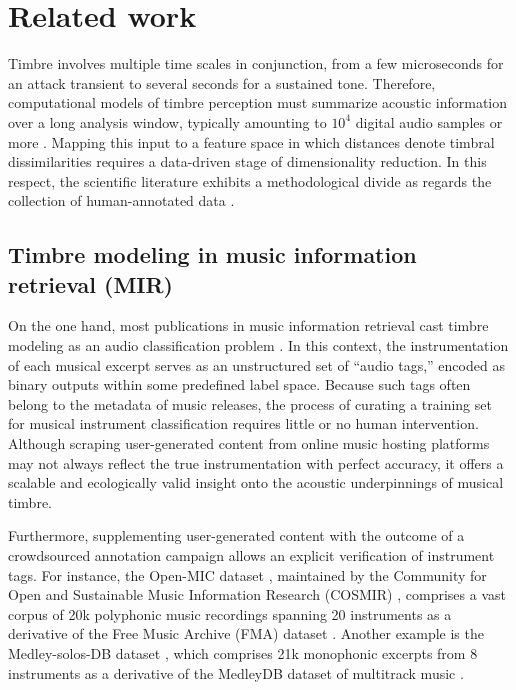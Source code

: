 \documentclass{bmcart}
\newcommand{\nmu}{}
\begin{document}
\section*{\nmu Related work}
\label{sec:soa}

Timbre involves multiple time scales in conjunction, from a few microseconds for an attack transient to several seconds for a sustained tone.
Therefore, computational models of timbre perception must summarize acoustic information over a long analysis window, typically amounting to $10^{4}$ digital audio samples or more \cite{joder2009taslp}.
Mapping this input to a feature space in which distances denote timbral dissimilarities requires a data-driven stage of dimensionality reduction.
In this respect, the scientific literature exhibits a methodological divide as regards the collection of human-annotated data \cite{siedenburg2016jnmr}.


\subsection*{Timbre modeling in music information retrieval (MIR)}
On the one hand, most publications in music information retrieval cast timbre modeling as an audio classification problem  \cite{martin1998asa,brown1999jasa,eronen2000icassp,herrera2003jnmr,wieczorkowska2003jiis,livshin2004dafx,krishna2004icassp,kaminskyj2005jiis,benetos2006icassp,bhalke2016jiis}.
In this context, the instrumentation of each musical excerpt serves as an unstructured set of ``audio tags,'' encoded as binary outputs within some predefined label space.
Because such tags often belong to the metadata of music releases, the process of curating a training set for musical instrument classification requires little or no human intervention.
Although scraping user-generated content from online music hosting platforms may not always reflect the true instrumentation with perfect accuracy, it offers a scalable and ecologically valid insight onto the acoustic underpinnings of musical timbre.

Furthermore, supplementing user-generated content with the outcome of a crowdsourced annotation campaign allows an explicit verification of instrument tags.
For instance, the Open-MIC dataset \cite{humphrey2018ismir}, maintained by the Community for Open and Sustainable Music Information Research (COSMIR) \cite{mcfee2016ismir}, comprises a vast corpus of 20k polyphonic music recordings spanning 20 instruments as a derivative of the Free Music Archive (FMA) dataset \cite{defferrard2017ismir}.
Another example is the Medley-solos-DB dataset \cite{lostanlen2016ismir}, which comprises 21k monophonic excerpts from 8 instruments as a derivative of the MedleyDB dataset of multitrack music \cite{bittner2014ismir}.
\end{document}
